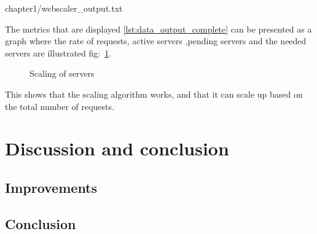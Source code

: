 \begin{center}

{chapter1/webscaler_output.txt}
\end{center}

The metrics that are displayed \ref{lst:data_output_complete} can be presented 
as a graph where the rate of requests, active servers ,pending servers and the 
needed servers are illustrated fig:~\ref{fig:server_scaling}.

\begin{figure}[htp]
\centering
{}
\caption{\label{fig:server_scaling}Scaling of servers}
\end{figure}

This shows that the scaling algorithm works, and that it can scale up based on
the total number of requests.

\section{Discussion and conclusion}
% 

\subsection{Improvements}

\subsection{Conclusion}

